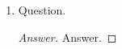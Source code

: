 \documentclass[../psets.tex]{subfiles}
\begin{document}
\begin{enumerate}
    \item {}Question.
    \begin{proof}[Answer]
        Answer.
    \end{proof}
\end{enumerate}
\end{document}
